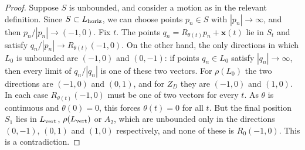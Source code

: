 \begin{proof}
Suppose $S$ is unbounded, and consider a motion as in the relevant definition. Since $S\subset L_{\mathrm{horiz}}$, we can choose points $p_n\in S$ with $|p_n|\to\infty$, and then $p_n/|p_n|\to(-1,0)$. Fix $t$. The points $q_n=R_{\theta(t)}p_n+\mathbf{x}(t)$ lie in $S_t$ and satisfy $q_n/|p_n|\to R_{\theta(t)}(-1,0)$. On the other hand, the only directions in which $L_0$ is unbounded are $(-1,0)$ and $(0,-1)$: if points $q_n\in L_0$ satisfy $|q_n|\to\infty$, then every limit of $q_n/|q_n|$ is one of these two vectors. For $\rho(L_0)$ the two directions are $(-1,0)$ and $(0,1)$, and for $Z_D$ they are $(-1,0)$ and $(1,0)$. In each case $R_{\theta(t)}(-1,0)$ must be one of two vectors for every $t$. As $\theta$ is continuous and $\theta(0)=0$, this forces $\theta(t)=0$ for all $t$. But the final position $S_1$ lies in $L_{\mathrm{vert}}$, $\rho(L_{\mathrm{vert}})$ or $A_2$, which are unbounded only in the directions $(0,-1)$, $(0,1)$ and $(1,0)$ respectively, and none of these is $R_0(-1,0)$. This is a contradiction.
\end{proof}
